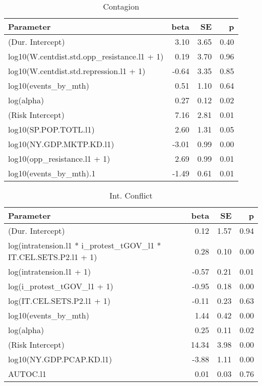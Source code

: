 \documentclass[pdftex,11pt]{article}
\begin{document}
\begin{table*}[ht]
\centering
\begin{tabular}{lrrr}
  \hline
Parameter & beta & SE & p \\ 
  \hline
(Dur. Intercept) & 3.10 & 3.65 & 0.40 \\ 
  log10(W.centdist.std.opp\_resistance.l1 + 1) & 0.19 & 3.70 & 0.96 \\ 
  log10(W.centdist.std.repression.l1 + 1) & -0.64 & 3.35 & 0.85 \\ 
  log10(events\_by\_mth) & 0.51 & 1.10 & 0.64 \\ 
  log(alpha) & 0.27 & 0.12 & 0.02 \\ 
  (Risk Intercept) & 7.16 & 2.81 & 0.01 \\ 
  log10(SP.POP.TOTL.l1) & 2.60 & 1.31 & 0.05 \\ 
  log10(NY.GDP.MKTP.KD.l1) & -3.01 & 0.99 & 0.00 \\ 
  log10(opp\_resistance.l1 + 1) & 2.69 & 0.99 & 0.01 \\ 
  log10(events\_by\_mth).1 & -1.49 & 0.61 & 0.01 \\ 
   \hline
\end{tabular}
\caption{Contagion} 
\label{model5}
\end{table*}
\begin{table*}[ht]
\centering
\begin{tabular}{lrrr}
  \hline
Parameter & beta & SE & p \\ 
  \hline
(Dur. Intercept) & 0.12 & 1.57 & 0.94 \\ 
  log(intratension.l1 * i\_protest\_tGOV\_l1 * IT.CEL.SETS.P2.l1 + 1) & 0.28 & 0.10 & 0.00 \\ 
  log(intratension.l1 + 1) & -0.57 & 0.21 & 0.01 \\ 
  log(i\_protest\_tGOV\_l1 + 1) & -0.95 & 0.18 & 0.00 \\ 
  log(IT.CEL.SETS.P2.l1 + 1) & -0.11 & 0.23 & 0.63 \\ 
  log10(events\_by\_mth) & 1.44 & 0.42 & 0.00 \\ 
  log(alpha) & 0.25 & 0.11 & 0.02 \\ 
  (Risk Intercept) & 14.34 & 3.98 & 0.00 \\ 
  log10(NY.GDP.PCAP.KD.l1) & -3.88 & 1.11 & 0.00 \\ 
  AUTOC.l1 & 0.01 & 0.03 & 0.76 \\ 
   \hline
\end{tabular}
\caption{Int. Conflict} 
\label{model6}
\end{table*}
\end{document}
